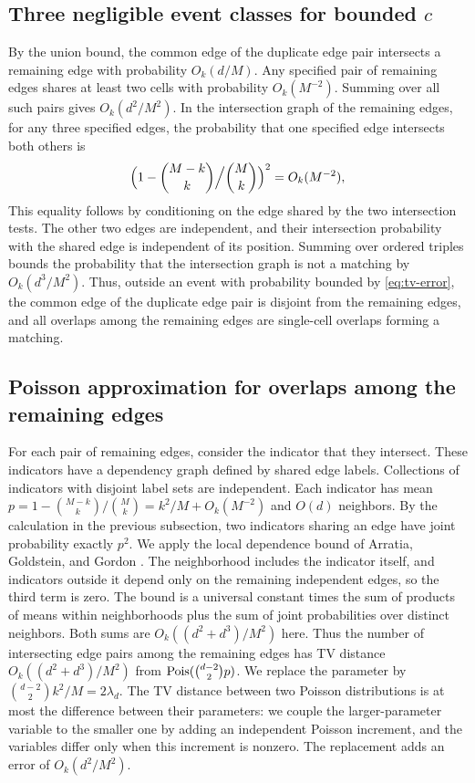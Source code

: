 \subsection{Three negligible event classes for bounded \texorpdfstring{$c$}{c}}
By the union bound, the common edge of the duplicate edge pair intersects a remaining edge with probability $O_k(d/M)$. Any specified pair of remaining edges shares at least two cells with probability $O_k(M^{-2})$. Summing over all such pairs gives $O_k(d^2/M^2)$. In the intersection graph of the remaining edges, for any three specified edges, the probability that one specified edge intersects both others is
\begin{equation*}
\Bigl(1-\binom{M-k}{k}\Big/\binom Mk\Bigr)^2=O_k(M^{-2}),
\end{equation*}
This equality follows by conditioning on the edge shared by the two intersection tests. The other two edges are independent, and their intersection probability with the shared edge is independent of its position. Summing over ordered triples bounds the probability that the intersection graph is not a matching by $O_k(d^3/M^2)$. Thus, outside an event with probability bounded by \eqref{eq:tv-error}, the common edge of the duplicate edge pair is disjoint from the remaining edges, and all overlaps among the remaining edges are single-cell overlaps forming a matching.

\subsection{Poisson approximation for overlaps among the remaining edges}
For each pair of remaining edges, consider the indicator that they intersect. These indicators have a dependency graph defined by shared edge labels. Collections of indicators with disjoint label sets are independent. Each indicator has mean $p=1-\binom{M-k}k/\binom Mk=k^2/M+O_k(M^{-2})$ and $O(d)$ neighbors. By the calculation in the previous subsection, two indicators sharing an edge have joint probability exactly $p^2$. We apply the local dependence bound of Arratia, Goldstein, and Gordon \cite[Theorem~1]{arratia1989chen}. The neighborhood includes the indicator itself, and indicators outside it depend only on the remaining independent edges, so the third term is zero. The bound is a universal constant times the sum of products of means within neighborhoods plus the sum of joint probabilities over distinct neighbors. Both sums are $O_k((d^2+d^3)/M^2)$ here. Thus the number of intersecting edge pairs among the remaining edges has TV distance $O_k((d^2+d^3)/M^2)$ from $\operatorname{Pois}(\binom{d-2}2p)$. We replace the parameter by $\binom{d-2}2k^2/M=2\lambda_d$. The TV distance between two Poisson distributions is at most the difference between their parameters: we couple the larger-parameter variable to the smaller one by adding an independent Poisson increment, and the variables differ only when this increment is nonzero. The replacement adds an error of $O_k(d^2/M^2)$.

